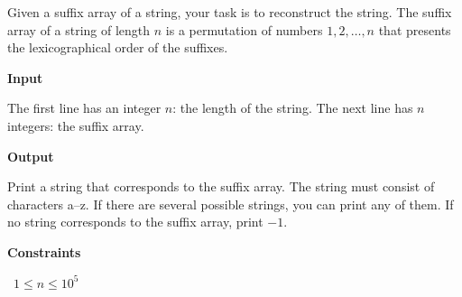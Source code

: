 Given a suffix array of a string, your task is to reconstruct the string.
The suffix array of a string of length $n$ is a permutation of numbers $1,2,\dots,n$ that presents the lexicographical order of the suffixes.

\vspace{0.3cm}\noindent\textbf{Input}

The first line has an integer $n$: the length of the string.
The next line has $n$ integers: the suffix array.

\vspace{0.3cm}\noindent\textbf{Output}

Print a string that corresponds to the suffix array. The string must consist of characters a–z. If there are several possible strings, you can print any of them.
If no string corresponds to the suffix array, print $-1$.

\vspace{0.3cm}\noindent\textbf{Constraints}

\textbullet\ $1 \le n \le 10^5$